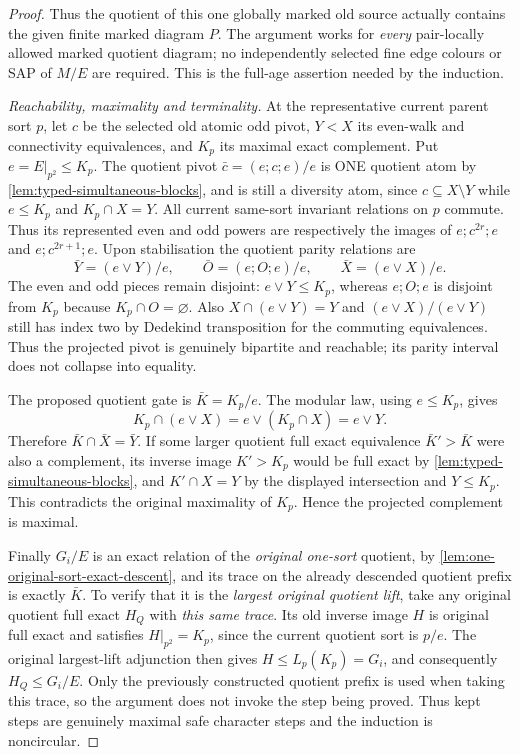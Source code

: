 \begin{proof}
Thus the quotient of this one globally marked
old source actually contains the given finite
marked diagram \(P\). The argument works for
\emph{every} pair-locally allowed marked quotient
diagram; no independently selected fine edge
colours or SAP of \(M/E\) are required. This is
the full-age assertion needed by the induction.

\emph{Reachability, maximality and terminality.}
At the representative current parent sort \(p\),
let \(c\) be the selected old atomic odd pivot,
\(Y<X\) its even-walk and connectivity equivalences,
and \(K_p\) its maximal exact complement. Put
\(e=E|_{p^2}\le K_p\). The quotient pivot
\(\bar c=(e;c;e)/e\) is ONE quotient atom
by \cref{lem:typed-simultaneous-blocks}, and
is still a diversity atom, since
\(c\subseteq X\setminus Y\) while
\(e\le K_p\) and \(K_p\cap X=Y\).
All current same-sort invariant relations on \(p\)
commute. Thus its represented even and odd powers
are respectively the images of \(e;c^{2r};e\)
and \(e;c^{2r+1};e\). Upon stabilisation the
quotient parity relations are
\[
  \bar Y=(e\vee Y)/e,\qquad
  \bar O=(e;O;e)/e,\qquad
  \bar X=(e\vee X)/e .
  \tag{E11}\label{eq:ep-quotient-parity}
\]
The even and odd pieces remain disjoint:
\(e\vee Y\le K_p\), whereas
\(e;O;e\) is disjoint from \(K_p\)
because \(K_p\cap O=\varnothing\).
Also
\(X\cap(e\vee Y)=Y\) and
\((e\vee X)/(e\vee Y)\) still has
index two by Dedekind transposition
for the commuting equivalences.
Thus the projected pivot is genuinely bipartite
and reachable; its parity interval does not
collapse into equality.

The proposed quotient gate is
\(\bar K=K_p/e\).
The modular law, using \(e\le K_p\), gives
\[
  K_p\cap(e\vee X)=e\vee(K_p\cap X)
                         =e\vee Y.
\]
Therefore \(\bar K\cap\bar X=\bar Y\).
If some larger quotient full exact equivalence
\(\bar K'>\bar K\) were also a complement,
its inverse image \(K'>K_p\) would be
full exact by \cref{lem:typed-simultaneous-blocks},
and \(K'\cap X=Y\) by the displayed
intersection and \(Y\le K_p\).
This contradicts the original maximality of
\(K_p\). Hence the projected complement is maximal.

Finally \(G_i/E\) is an exact relation of the
\emph{original one-sort} quotient, by
\cref{lem:one-original-sort-exact-descent},
and its trace on the already descended
quotient prefix is exactly \(\bar K\).
To verify that it is the \emph{largest original
quotient lift}, take any original quotient
full exact \(H_Q\) with \emph{this same trace}.
Its old inverse image \(H\) is original full exact
and satisfies \(H|_{p^2}=K_p\), since the current
quotient sort is \(p/e\).
The original largest-lift adjunction then gives
\(H\le L_p(K_p)=G_i\), and consequently
\(H_Q\le G_i/E\). Only the previously constructed
quotient prefix is used when taking this trace,
so the argument does not invoke the step
being proved. Thus kept steps are genuinely
maximal safe character steps and the induction
is noncircular.


\end{proof}

